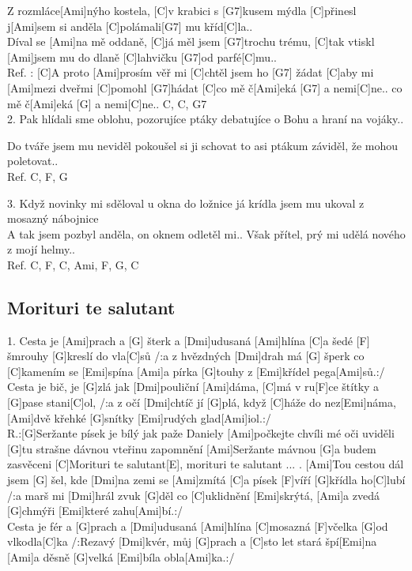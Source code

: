 \documentclass[10pt]{article}
\begin{document}
\begin{Large}
\begin{minipage}{\textwidth}
\begin{multicols}{2}
\begin{guitar}
	[C]Z rozmláce[Ami]nýho kostela,
	[C]v krabici s [G7]kusem mýdla
	[C]přinesl j[Ami]sem si anděla
	[C]polámali[G7] mu kříd[C]la..
	\\
	[C]Díval se [Ami]na mě oddaně,
	[C]já měl jsem [G7]trochu trému,
	[C]tak vtiskl [Ami]jsem mu do dlaně
	[C]lahvičku [G7]od parfé[C]mu..
	\\
	Ref. : [C]A proto [Ami]prosím věř mi
	[C]chtěl jsem ho [G7] žádat
	[C]aby mi [Ami]mezi dveřmi
	[C]pomohl [G7]hádat
	[C]co mě č[Ami]eká  [G7] a nemi[C]ne..
	co mě č[Ami]eká [G] a nemi[C]ne..
	C, C, G7
	\\
	2. Pak hlídali sme oblohu,
	pozorujíce ptáky
	debatujíce o Bohu
	a hraní na vojáky..
	
	Do tváře jsem mu neviděl
	pokoušel si ji schovat
	to asi ptákum záviděl,
	že mohou poletovat..
	\\
	Ref. 
	C, F, G
	
	3. Když novinky mi sděloval
	u okna do ložnice
	já krídla jsem mu ukoval
	z mosazný nábojnice
	\\
	A tak jsem pozbyl anděla,
	on oknem odletěl mi..
	Však přítel, prý mi udělá
	nového z mojí helmy..
	\\
	Ref. 
	C, F, C, Ami, F, G, C
\end{guitar}
\end{multicols}
\end{minipage}

\begin{minipage}{\textwidth}
\subsection{Morituri te salutant}
\begin{multicols}{2}
\begin{guitar}
	1.
	Cesta je [Ami]prach a [G] šterk a [Dmi]udusaná [Ami]hlína 
	[C]a šedé [F] šmrouhy [G]kreslí do vla[C]sů
	/:a z hvězdných [Dmi]drah má [G] šperk 
	co [C]kamením se [Emi]spína 
	[Ami]a pírka [G]touhy z [Emi]křídel pega[Ami]sů.:/	
	\\
	Cesta je bič, je [G]zlá jak [Dmi]pouliční [Ami]dáma, 
	[C]má v ru[F]ce štítky a [G]pase stani[C]ol, 
	/:a z očí [Dmi]chtíč jí [G]plá, když [C]háže do nez[Emi]náma, 
	[Ami]dvě křehké [G]snítky [Emi]rudých glad[Ami]iol.:/
	\\
	R.:[G]Seržante písek je bílý jak paže Daniely
	[Ami]počkejte chvíli mé oči uviděli
	[G]tu strašne dávnou vteřinu zapomnění	
	[Ami]Seržante mávnou [G]a budem zasvěceni	
	[C]Morituri te salutant[E], morituri te salutant ...
	.
	[Ami]Tou cestou dál jsem [G] šel, 
	kde [Dmi]na zemi se [Ami]zmítá	
	[C]a písek [F]víří [G]křídla ho[C]lubí 
	/:a marš mi [Dmi]hrál	zvuk [G]děl 
	co [C]uklidnění [Emi]skrýtá,	
	[Ami]a zvedá [G]chmýři [Emi]které zahu[Ami]bí.:/	
	\\	
	[Ami]Cesta je fér a [G]prach a [Dmi]udusaná [Ami]hlína	
	[C]mosazná [F]včelka [G]od vlkodla[C]ka	
	/:Rezavý [Dmi]kvér, můj [G]prach a [C]sto let stará špí[Emi]na	
	[Ami]a děsně [G]velká [Emi]bíla obla[Ami]ka.:/
\end{guitar}
\end{multicols}
\end{minipage}


\end{Large}
\end{document}

